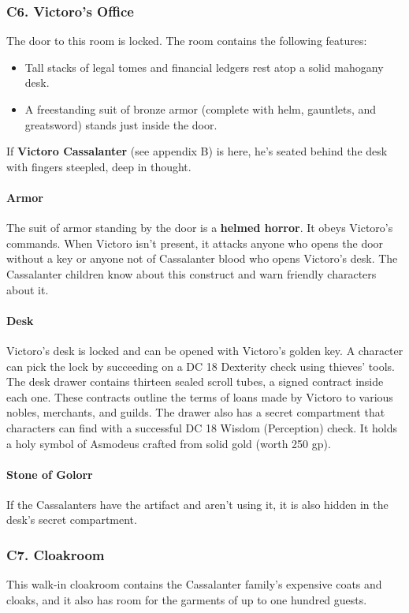 \documentclass[10pt,a4paper,twoside,twocolumn,openany,nodeprecatedcode]{dndbook}
\begin{document}
\subsubsection{C6. Victoro's Office}
The door to this room is locked. The room contains the following features:
\begin{itemize}

\item Tall stacks of legal tomes and financial ledgers rest atop a solid mahogany desk.
\item A freestanding suit of bronze armor (complete with helm, gauntlets, and greatsword) stands just inside the door.
\end{itemize}


If \textbf{Victoro Cassalanter} (see appendix B) is here, he's seated behind the desk with fingers steepled, deep in thought.
\paragraph{Armor}
The suit of armor standing by the door is a \textbf{helmed horror}. It obeys Victoro's commands. When Victoro isn't present, it attacks anyone who opens the door without a key or anyone not of Cassalanter blood who opens Victoro's desk. The Cassalanter children know about this construct and warn friendly characters about it.
\paragraph{Desk}
Victoro's desk is locked and can be opened with Victoro's golden key. A character can pick the lock by succeeding on a DC 18 Dexterity check using thieves' tools. The desk drawer contains thirteen sealed scroll tubes, a signed contract inside each one. These contracts outline the terms of loans made by Victoro to various nobles, merchants, and guilds. The drawer also has a secret compartment that characters can find with a successful DC 18 Wisdom (Perception) check. It holds a holy symbol of Asmodeus crafted from solid gold (worth 250 gp).
\paragraph{Stone of Golorr}
If the Cassalanters have the artifact and aren't using it, it is also hidden in the desk's secret compartment.
\subsubsection{C7. Cloakroom}
This walk-in cloakroom contains the Cassalanter family's expensive coats and cloaks, and it also has room for the garments of up to one hundred guests.
\end{document}
